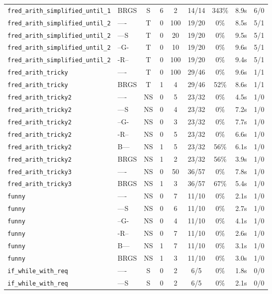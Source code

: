 \begin{tabular}{llccccccc}
\texttt{fred_arith_simplified_until_1} & BRGS & S & 6 & 2 & 14/14 & 343\% & 8.9s & 6/0 \\
\texttt{fred_arith_simplified_until_2} & ---- & T & 0 & 100 & 19/20 & 0\% & 8.5s & 5/1 \\
\texttt{fred_arith_simplified_until_2} & ---S & T & 0 & 20 & 19/20 & 0\% & 9.5s & 5/1 \\
\texttt{fred_arith_simplified_until_2} & --G- & T & 0 & 10 & 19/20 & 0\% & 9.6s & 5/1 \\
\texttt{fred_arith_simplified_until_2} & -R-- & T & 0 & 100 & 19/20 & 0\% & 9.4s & 5/1 \\
\texttt{fred_arith_tricky} & ---- & T & 0 & 100 & 29/46 & 0\% & 9.6s & 1/1 \\
\texttt{fred_arith_tricky} & BRGS & T & 1 & 4 & 29/46 & 52\% & 8.6s & 1/1 \\
\texttt{fred_arith_tricky2} & ---- & NS & 0 & 5 & 23/32 & 0\% & 4.5s & 1/0 \\
\texttt{fred_arith_tricky2} & ---S & NS & 0 & 4 & 23/32 & 0\% & 7.2s & 1/0 \\
\texttt{fred_arith_tricky2} & --G- & NS & 0 & 3 & 23/32 & 0\% & 7.7s & 1/0 \\
\texttt{fred_arith_tricky2} & -R-- & NS & 0 & 5 & 23/32 & 0\% & 6.6s & 1/0 \\
\texttt{fred_arith_tricky2} & B--- & NS & 1 & 5 & 23/32 & 56\% & 6.1s & 1/0 \\
\texttt{fred_arith_tricky2} & BRGS & NS & 1 & 2 & 23/32 & 56\% & 3.9s & 1/0 \\
\texttt{fred_arith_tricky3} & ---- & NS & 0 & 50 & 36/57 & 0\% & 7.8s & 1/0 \\
\texttt{fred_arith_tricky3} & BRGS & NS & 1 & 3 & 36/57 & 67\% & 5.4s & 1/0 \\
\texttt{funny} & ---- & NS & 0 & 7 & 11/10 & 0\% & 2.1s & 1/0 \\
\texttt{funny} & ---S & NS & 0 & 6 & 11/10 & 0\% & 2.7s & 1/0 \\
\texttt{funny} & --G- & NS & 0 & 4 & 11/10 & 0\% & 4.1s & 1/0 \\
\texttt{funny} & -R-- & NS & 0 & 7 & 11/10 & 0\% & 2.6s & 1/0 \\
\texttt{funny} & B--- & NS & 1 & 7 & 11/10 & 0\% & 3.1s & 1/0 \\
\texttt{funny} & BRGS & NS & 1 & 3 & 11/10 & 0\% & 3.0s & 1/0 \\
\texttt{if_while_with_req} & ---- & S & 0 & 2 & 6/5 & 0\% & 1.8s & 0/0 \\
\texttt{if_while_with_req} & ---S & S & 0 & 2 & 6/5 & 0\% & 2.1s & 0/0 \\

\end{tabular}
